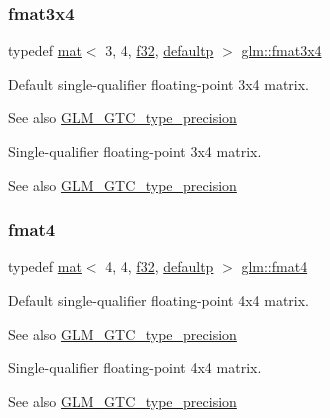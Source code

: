 \subsubsection{\texorpdfstring{fmat3x4}{fmat3x4}}
{\footnotesize\ttfamily typedef \hyperlink{structglm_1_1mat}{mat}$<$ 3, 4, \hyperlink{group__gtc__type__precision_ga0ec999b57f5330d9021256e96038df04}{f32}, \hyperlink{namespaceglm_a36ed105b07c7746804d7fdc7cc90ff25a9d21ccd8b5a009ec7eb7677befc3bf51}{defaultp} $>$ \hyperlink{group__gtc__type__precision_gab2daf8468a8b9343c065816df07e29fe}{glm\+::fmat3x4}}

Default single-\/qualifier floating-\/point 3x4 matrix. \begin{DoxySeeAlso}{See also}
\hyperlink{group__gtc__type__precision}{G\+L\+M\+\_\+\+G\+T\+C\+\_\+type\+\_\+precision}
\end{DoxySeeAlso}
Single-\/qualifier floating-\/point 3x4 matrix. \begin{DoxySeeAlso}{See also}
\hyperlink{group__gtc__type__precision}{G\+L\+M\+\_\+\+G\+T\+C\+\_\+type\+\_\+precision} 
\end{DoxySeeAlso}
\mbox{\label{group__gtc__type__precision_ga96345dda8e140bf8511b3e53128c0196}} 
\subsubsection{\texorpdfstring{fmat4}{fmat4}}
{\footnotesize\ttfamily typedef \hyperlink{structglm_1_1mat}{mat}$<$ 4, 4, \hyperlink{group__gtc__type__precision_ga0ec999b57f5330d9021256e96038df04}{f32}, \hyperlink{namespaceglm_a36ed105b07c7746804d7fdc7cc90ff25a9d21ccd8b5a009ec7eb7677befc3bf51}{defaultp} $>$ \hyperlink{group__gtc__type__precision_ga96345dda8e140bf8511b3e53128c0196}{glm\+::fmat4}}

Default single-\/qualifier floating-\/point 4x4 matrix. \begin{DoxySeeAlso}{See also}
\hyperlink{group__gtc__type__precision}{G\+L\+M\+\_\+\+G\+T\+C\+\_\+type\+\_\+precision}
\end{DoxySeeAlso}
Single-\/qualifier floating-\/point 4x4 matrix. \begin{DoxySeeAlso}{See also}
\hyperlink{group__gtc__type__precision}{G\+L\+M\+\_\+\+G\+T\+C\+\_\+type\+\_\+precision} 
\end{DoxySeeAlso}
\mbox{\label{group__gtc__type__precision_ga279cf309f0098c3d26ce88fe8a26375a}} 
